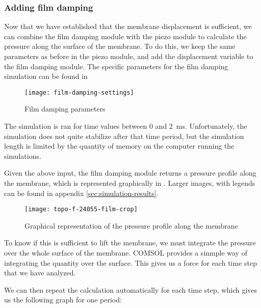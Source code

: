 \subsubsection{Adding film damping}

Now that we have established that the membrane displacement is sufficient, we
can combine the film damping module with the piezo module to calculate the
pressure along the surface of the membrane. To do this, we keep the same
parameters as before in the piezo module, and add the displacement variable to
the film damping module. The specific parameters for the film damping simulation
can be found in 

\begin{figure}[!h]
  \begin{center}
    \texttt{[image: film-damping-settings]}
  \end{center}
  \caption{Film damping parameters}
  \label{fig:film-damping-settings}
\end{figure}

The simulation is ran for time values between 0 and \SI{2}{\milli\second}.
Unfortunately, the simulation does not quite stabilize after that time period,
but the simulation length is limited by the quantity of memory on the computer
running the simulations.

Given the above input, the film damping module returns a pressure profile along
the membrane, which is represented graphically in .
Larger images, with legends can be found in appendix
\ref{sec:simulation-results}.

\begin{figure}[h]
  \begin{center}
    \texttt{[image: topo-f-24055-film-crop]}
  \end{center}
  \caption{Graphical representation of the pressure profile along the membrane}
  \label{fig:pressure-profile}
\end{figure}

To know if this is sufficient to lift the membrane, we must integrate the
pressure over the whole surface of the membrane. COMSOL provides a sinmple way
of integrating the quantity over the surface. This gives us a force for each
time step that we have analyzed.

We can then repeat the calculation automatically for each time step, which gives
us the following graph for one period:

